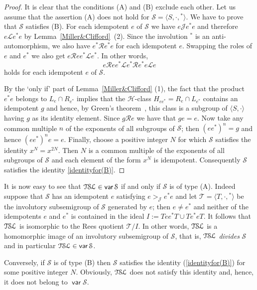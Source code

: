 \documentclass[11pt,reqno]{amsart}
\def\Rc{\mathrel{\mathscr{R}}}
\def\Lc{\mathrel{\mathscr{L}}}
\def\Jc{\mathrel{\mathscr{J}}}
\newcommand{\TSL}{\ensuremath{\mathcal{T\kern-.5pt S\kern-.5pt L}}}
\DeclareMathOperator{\var}{\mathsf{var}}
\begin{document}
\begin{proof} It is clear that the conditions (A) and (B) exclude each other. Let us assume that the assertion (A) does not hold
for $\mathcal{S}=\langle S,\cdot,{}^*\rangle$. We have to prove that $\mathcal{S}$ satisfies (B). For each idempotent $e$ of $\mathcal{S}$
we have $e\Jc e^*e$ and therefore $e\Lc e^*e$ by Lemma~\ref{Miller&Clifford}~(2). Since the involution ${}^*$ is an anti-automorphism, we
also have $e^*\Rc e^*e$ for each idempotent $e$. Swapping the roles of $e$ and $e^*$ we also get $e\Rc ee^*\Lc e^*$. In other words,
$$e\Rc ee^*\Lc e^*\Rc e^*e\Lc e$$ holds for each idempotent $e$ of $\mathcal{S}$.

By the `only if' part of Lemma~\ref{Miller&Clifford} (1), the fact that the product $e^*e$ belongs to $L_e\cap R_{e^*}$ implies that the
$\mathscr{H}$-class $H_{ee^*}=R_e\cap L_{e^*}$ contains an idempotent $g$ and hence, by Green's theorem~\cite[Theorem~2.2.5]{how}, this
class is a subgroup of $\langle S,\cdot\rangle$ having $g$ as its identity element. Since $g\Rc e$ we have that $ge=e$. Now take any common
multiple $n$ of the exponents of all subgroups of $\mathcal{S}$; then $(ee^*)^n=g$ and hence $(ee^*)^ne=e$.  Finally, choose a positive
integer $N$ for which $\mathcal{S}$ satisfies the identity $x^N=x^{2N}$. Then $N$ is a common multiple of the exponents of all subgroups of
$\mathcal{S}$ and each element of the form $x^N$ is idempotent. Consequently $\mathcal{S}$ satisfies the identity \eqref{identityfor(B)}.
\end{proof}

It is now easy to see that $\TSL\in\var\mathcal{S}$ if and only if $\mathcal{S}$ is of type (A). Indeed suppose
that $\mathcal{S}$ has an idempotent $e$ satisfying $e\mathrel{{>}_{\!\!\!\Jc}} e^*e$ and let $\mathcal{T}=\langle T,\cdot,{}^*\rangle$
be the involutory subsemigroup of $\mathcal{S}$ generated by $e$; then $e\ne e^*$ and neither of the idempotents $e$ and $e^*$
is contained in the ideal $I:=Tee^*T\cup Te^*eT$. It follows that $\TSL$ is isomorphic to the Rees quotient $\mathcal{T}/I$.
In other words, $\TSL$ is a homomorphic image of an involutory subsemigroup of $\mathcal{S}$, that is, $\TSL$ \emph{divides}
$\mathcal{S}$ and in particular $\TSL\in \var\mathcal{S}$.

Conversely, if $\mathcal{S}$ is of type (B) then  $\mathcal{S}$ satisfies the identity (\ref{identityfor(B)})
 for some positive integer $N$. Obviously, $\TSL$ does not satisfy this identity and, hence, it does not belong to $\var\mathcal{S}$.
\end{document}
